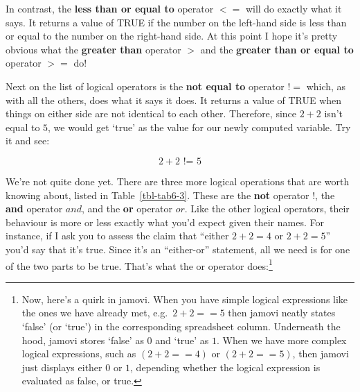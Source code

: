 \documentclass[
  a4paper,
]{book}
\begin{document}
In contrast, the \textbf{less than or equal to} operator \(<=\) will do
exactly what it says. It returns a value of TRUE if the number on the
left-hand side is less than or equal to the number on the right-hand
side. At this point I hope it's pretty obvious what the \textbf{greater
than} operator \(>\) and the \textbf{greater than or equal to} operator
\(>=\) do!

Next on the list of logical operators is the \textbf{not equal to}
operator \(!=\) which, as with all the others, does what it says it
does. It returns a value of TRUE when things on either side are not
identical to each other. Therefore, since \(2 + 2\) isn't equal to
\(5\), we would get `true' as the value for our newly computed variable.
Try it and see:

\[2 + 2 \text{ != } 5\]

We're not quite done yet. There are three more logical operations that
are worth knowing about, listed in Table~\ref{tbl-tab6-3}. These are the
\textbf{not} operator \(!\), the \textbf{and} operator \(and\), and the
\textbf{or} operator \(or\). Like the other logical operators, their
behaviour is more or less exactly what you'd expect given their names.
For instance, if I ask you to assess the claim that ``either
\(2 + 2 = 4\) or \(2 + 2 = 5\)'' you'd say that it's true. Since it's an
``either-or'' statement, all we need is for one of the two parts to be
true. That's what the or operator does:\footnote{Now, here's a quirk in
  jamovi. When you have simple logical expressions like the ones we have
  already met, e.g.~\(2 + 2 == 5\) then jamovi neatly states `false' (or
  `true') in the corresponding spreadsheet column. Underneath the hood,
  jamovi stores `false' as \(0\) and `true' as \(1\). When we have more
  complex logical expressions, such as \((2+2 == 4)\) or \((2+2 == 5)\),
  then jamovi just displays either \(0\) or \(1\), depending whether the
  logical expression is evaluated as false, or true.}

\hypertarget{tbl-tab6-2}{}
 
  \providecommand{\huxb}[2]{\arrayrulecolor[RGB]{#1}\global\arrayrulewidth=#2pt}
  \providecommand{\huxvb}[2]{\color[RGB]{#1}\vrule width #2pt}
  \providecommand{\huxtpad}[1]{\rule{0pt}{#1}}
  \providecommand{\huxbpad}[1]{\rule[-#1]{0pt}{#1}}
\end{document}
